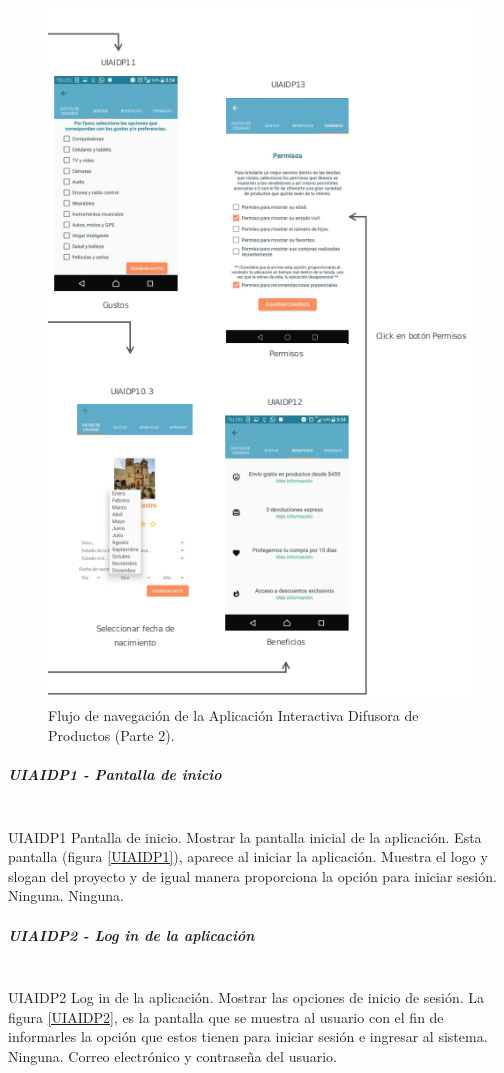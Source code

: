 \FloatBarrier
\begin{figure}[htbp!]
		\centering
			\includegraphics[width=.75 \textwidth]{imagenes/UI_userapp/mapaNav2P2}
		\caption{Flujo de navegación de la Aplicación Interactiva Difusora de Productos (Parte 2).}
		\label{image:flujoNavegacionDifusoraDerivada3}
\end{figure}
\FloatBarrier

\hypertarget{Pantallas}{}
\subparagraph{UIAIDP1 - Pantalla de inicio} ~\\
\FloatBarrier
{} %
{UIAIDP1} %
{Pantalla de inicio.}  %
{Mostrar la pantalla inicial de la aplicación.} %
{Esta pantalla (figura \ref{UIAIDP1}), aparece al iniciar la aplicación. Muestra el logo y slogan del proyecto y de igual manera proporciona la opción para iniciar sesión.} %
{Ninguna.} %
{Ninguna.} %
\FloatBarrier

\subparagraph{UIAIDP2 - Log in de la aplicación} ~\\
\FloatBarrier
{} %
{UIAIDP2} %
{Log in de la aplicación.}  %
{Mostrar las opciones de inicio de sesión.} %
{La figura \ref{UIAIDP2}, es la pantalla que se muestra al usuario con el fin de informarles la opción que estos tienen para iniciar sesión e ingresar al sistema.} %
{Ninguna.} %
{Correo electrónico y contraseña del usuario.} %
\FloatBarrier

